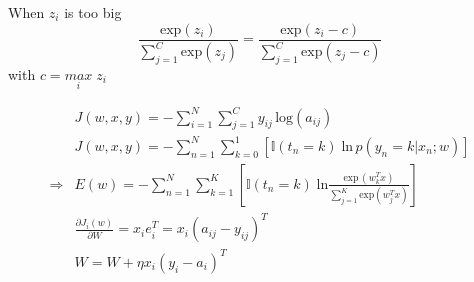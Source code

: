 When $z_i$ is too big
\begin{equation}
	\frac{\text{exp}(z_i)}{\sum_{j=1}^{C}\text{exp}(z_j)} = \frac{\text{exp}(z_i - c)}{\sum_{j=1}^{C}\text{exp}(z_j - c)}
\end{equation}
with $c = \underset{i}{max}\;z_i$

\begin{align}
	&J(w,x,y) = - \sum_{i=1}^{N} \sum_{j=1}^{C} y_{ij}\,\text{log}(a_{ij}) \\
	&J(w,x,y) = - \sum_{n=1}^{N} \sum_{k=0}^{1} \left[ \mathbb{I}(t_n=k)\; \text{ln}\,p(y_n=k | x_n; w) \right] \\
	\Rightarrow &E(w) = - \sum_{n=1}^{N} \sum_{k=1}^{K} \left[ \mathbb{I}(t_n=k)\; \text{ln}\frac{\text{exp}\,(w_k^T x)}{\sum_{j=1}^{K} \text{exp}(w_j^T x)} \right] \\
	&\frac{\partial J_i(w)}{\partial W} = x_i e_i^T = x_i (a_{ij} - y_{ij})^T \\
	&W = W + \eta x_i (y_i - a_i)^T
\end{align}